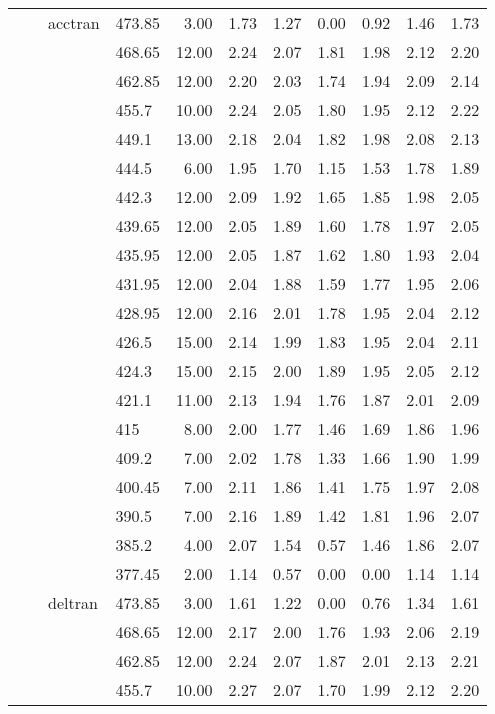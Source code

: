 \begin{longtable}{llllrrrrrrr}
   &  & acctran & 473.85 & 3.00 & 1.73 & 1.27 & 0.00 & 0.92 & 1.46 & 1.73 \\ 
   &  &  & 468.65 & 12.00 & 2.24 & 2.07 & 1.81 & 1.98 & 2.12 & 2.20 \\ 
   &  &  & 462.85 & 12.00 & 2.20 & 2.03 & 1.74 & 1.94 & 2.09 & 2.14 \\ 
   &  &  & 455.7 & 10.00 & 2.24 & 2.05 & 1.80 & 1.95 & 2.12 & 2.22 \\ 
   &  &  & 449.1 & 13.00 & 2.18 & 2.04 & 1.82 & 1.98 & 2.08 & 2.13 \\ 
   &  &  & 444.5 & 6.00 & 1.95 & 1.70 & 1.15 & 1.53 & 1.78 & 1.89 \\ 
   &  &  & 442.3 & 12.00 & 2.09 & 1.92 & 1.65 & 1.85 & 1.98 & 2.05 \\ 
   &  &  & 439.65 & 12.00 & 2.05 & 1.89 & 1.60 & 1.78 & 1.97 & 2.05 \\ 
   &  &  & 435.95 & 12.00 & 2.05 & 1.87 & 1.62 & 1.80 & 1.93 & 2.04 \\ 
   &  &  & 431.95 & 12.00 & 2.04 & 1.88 & 1.59 & 1.77 & 1.95 & 2.06 \\ 
   &  &  & 428.95 & 12.00 & 2.16 & 2.01 & 1.78 & 1.95 & 2.04 & 2.12 \\ 
   &  &  & 426.5 & 15.00 & 2.14 & 1.99 & 1.83 & 1.95 & 2.04 & 2.11 \\ 
   &  &  & 424.3 & 15.00 & 2.15 & 2.00 & 1.89 & 1.95 & 2.05 & 2.12 \\ 
   &  &  & 421.1 & 11.00 & 2.13 & 1.94 & 1.76 & 1.87 & 2.01 & 2.09 \\ 
   &  &  & 415 & 8.00 & 2.00 & 1.77 & 1.46 & 1.69 & 1.86 & 1.96 \\ 
   &  &  & 409.2 & 7.00 & 2.02 & 1.78 & 1.33 & 1.66 & 1.90 & 1.99 \\ 
   &  &  & 400.45 & 7.00 & 2.11 & 1.86 & 1.41 & 1.75 & 1.97 & 2.08 \\ 
   &  &  & 390.5 & 7.00 & 2.16 & 1.89 & 1.42 & 1.81 & 1.96 & 2.07 \\ 
   &  &  & 385.2 & 4.00 & 2.07 & 1.54 & 0.57 & 1.46 & 1.86 & 2.07 \\ 
   &  &  & 377.45 & 2.00 & 1.14 & 0.57 & 0.00 & 0.00 & 1.14 & 1.14 \\ 
   &  & deltran & 473.85 & 3.00 & 1.61 & 1.22 & 0.00 & 0.76 & 1.34 & 1.61 \\ 
   &  &  & 468.65 & 12.00 & 2.17 & 2.00 & 1.76 & 1.93 & 2.06 & 2.19 \\ 
   &  &  & 462.85 & 12.00 & 2.24 & 2.07 & 1.87 & 2.01 & 2.13 & 2.21 \\ 
   &  &  & 455.7 & 10.00 & 2.27 & 2.07 & 1.70 & 1.99 & 2.12 & 2.20 \\ 

\end{longtable}
